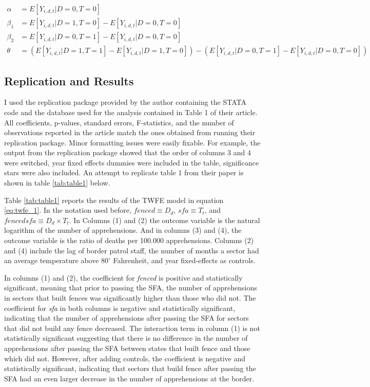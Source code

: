 \documentclass[titlepage]{article}
\theoremstyle{plain}
\theoremstyle{plain}
\begin{document}
\begin{align}
\label{eq:parameters_1}
	\alpha &= E[Y_{i,d,t}|D=0,T=0]\\
	\beta_{1} &= E[Y_{i,d,t}|D=1,T=0] - E[Y_{i,d,t}|D=0,T=0]\\
	\beta_{2} &= E[Y_{i,d,t}|D=0,T=1] - E[Y_{i,d,t}|D=0,T=0]\\
	\theta &= (E[Y_{i,d,t}|D=1,T=1]-E[Y_{i,d,t}|D=1,T=0])-(E[Y_{i,d,t}|D=0,T=1]-E[Y_{i,d,t}|D=0,T=0])
\end{align}


\subsection*{Replication and Results}

I used the replication package provided by the author containing the STATA code and the database used for the analysis contained in Table 1 of their article. All coefficients, p-values, standard errors, F-statistics, and the number of observations reported in the article match the ones obtained from running their replication package. Minor formatting issues were easily fixable. For example, the output from the replication package showed that the order of columns 3 and 4 were switched, year fixed effects dummies were included in the table, significance stars were also included. An attempt to replicate table 1 from their paper is shown in table \ref{tab:table1} below.




Table \ref{tab:table1} reports the results of the TWFE model in equation \ref{eq:twfe_1}. In the notation used before, $\textit{fenced} \equiv D_{d}$, $\textit{sfa} \equiv T_{t}$, and $\textit{fencedsfa} \equiv D_{d} \times T_{t}$. In Columns (1) and (2) the outcome variable is the natural logarithm of the number of apprehensions. And in columns (3) and (4), the outcome variable is the ratio of deaths per 100.000 apprehensions. Columns (2) and (4) include the lag of border patrol staff, the number of months a sector had an average temperature above $80^{\circ}$ Fahrenheit, and year fixed-effects as controls.

In columns (1) and (2), the coefficient for \textit{fenced} is positive and statistically significant, meaning that prior to passing the SFA, the number of apprehensions in sectors that built fences was significantly higher than those who did not. The coefficient for \textit{sfa} in both columns is negative and statistically significant, indicating that the number of apprehensions after passing the SFA for sectors that did not build any fence decreased. The interaction term in column (1) is not statistically significant suggesting that there is no difference in the number of apprehensions after passing the SFA between states that built fence and those which did not. However, after adding controls, the coefficient is negative and statistically significant, indicating that sectors that build fence after passing the SFA had an even larger decrease in the number of apprehensions at the border.
\end{document}
